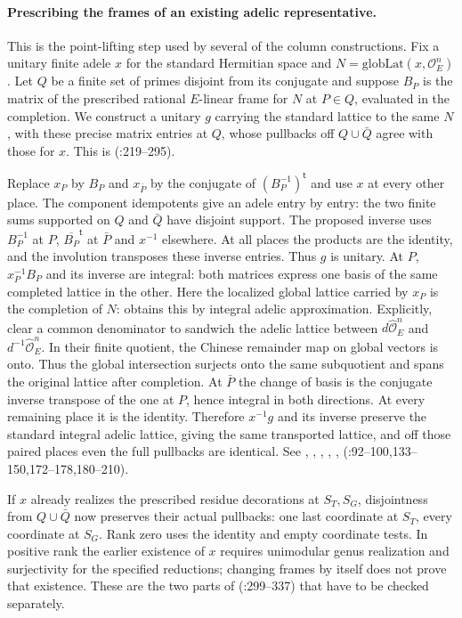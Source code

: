 \paragraph{Prescribing the frames of an existing adelic representative.}
This is the point-lifting step used by several of the column constructions.
Fix a unitary finite adele $x$ for the standard Hermitian space and
$N=\mathrm{globLat}(x,\mathcal O_E^n)$. Let $Q$ be a finite set of primes
disjoint from its conjugate and suppose $B_P$ is the matrix of the prescribed
rational $E$-linear frame for $N$ at $P\in Q$, evaluated in the completion. We construct a unitary $g$ carrying the
standard lattice to the same $N$, with these precise matrix entries at
$Q$, whose pullbacks off $Q\cup\bar Q$ agree with those for $x$.
This is 
(:219--295).

Replace $x_P$ by $B_P$ and $x_{\bar P}$ by the conjugate of
$(B_P^{-1})^{\mathsf t}$ and use $x$ at every other place. The component
idempotents give an adele entry by entry: the two finite sums supported on
$Q$ and $\bar Q$ have disjoint support. The proposed inverse uses
$B_P^{-1}$ at $P$, $\overline{B_P}^{\mathsf t}$ at $\bar P$ and
$x^{-1}$ elsewhere. At all places the products are the identity, and the
involution transposes these inverse entries. Thus $g$ is unitary. At $P$,
$x_P^{-1}B_P$ and its inverse are integral: both matrices express one
basis of the same completed lattice in the other. Here the localized
global lattice carried by $x_P$ is the completion of $N$:
 obtains this by integral adelic approximation.
Explicitly, clear a common denominator to sandwich the adelic lattice
between $d\widehat{\mathcal O}_E^n$ and
$d^{-1}\widehat{\mathcal O}_E^n$. In their finite quotient, the Chinese
remainder map on global vectors is onto. Thus the global intersection
surjects onto the same subquotient and spans the original lattice
after completion. At $\bar P$ the change of basis is the conjugate
inverse transpose of the one at $P$, hence integral in both directions.
At every remaining place it is the identity. Therefore $x^{-1}g$ and its
inverse preserve the standard integral adelic lattice, giving the
same transported lattice, and off those paired places even the full
pullbacks are identical. See , ,
, , ,
 (:92--100,133--150,172--178,180--210).

If $x$ already realizes the prescribed residue decorations at $S_T,S_G$,
disjointness from $Q\cup\bar Q$ now preserves their actual pullbacks:
one last coordinate at $S_T$, every coordinate at $S_G$. Rank zero
uses the identity and empty coordinate tests. In positive rank the
earlier existence of $x$ requires unimodular genus realization and
surjectivity for the specified reductions; changing frames by itself
does not prove that existence. These are the two parts of
 (:299--337)
that have to be checked separately.

